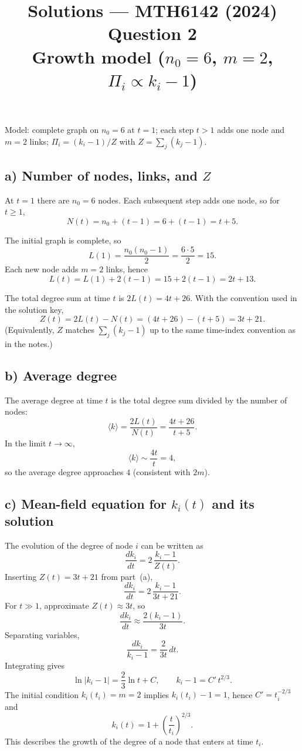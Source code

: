 \documentclass[11pt,a4paper]{article}
\title{Solutions --- MTH6142 (2024) Question 2\\Growth model ($n_0=6$, $m=2$, $\Pi_i \propto k_i-1$)}
\author{}
\date{}
\begin{document}
\maketitle

\noindent
Model: complete graph on $n_0=6$ at $t=1$; each step $t>1$ adds one node and $m=2$ links; $\Pi_i=(k_i-1)/Z$ with $Z=\sum_j(k_j-1)$.

\subsection*{a) Number of nodes, links, and $Z$}

At $t=1$ there are $n_0=6$ nodes. Each subsequent step adds one node, so for $t\ge 1$,
\[
  N(t) = n_0 + (t-1) = 6 + (t-1) = t + 5.
\]

The initial graph is complete, so
\[
  L(1) = \frac{n_0(n_0-1)}{2} = \frac{6\cdot 5}{2} = 15.
\]
Each new node adds $m=2$ links, hence
\[
  L(t) = L(1) + 2(t-1) = 15 + 2(t-1) = 2t + 13.
\]

The total degree sum at time $t$ is $2L(t) = 4t+26$. With the convention used in the solution key,
\[
  Z(t) = 2L(t) - N(t) = (4t + 26) - (t + 5) = 3t + 21.
\]
(Equivalently, $Z$ matches $\sum_j(k_j-1)$ up to the same time-index convention as in the notes.)

\subsection*{b) Average degree}

The average degree at time $t$ is the total degree sum divided by the number of nodes:
\[
  \langle k \rangle = \frac{2L(t)}{N(t)} = \frac{4t + 26}{t + 5}.
\]
In the limit $t\to\infty$,
\[
  \langle k \rangle \sim \frac{4t}{t} = 4,
\]
so the average degree approaches $4$ (consistent with $2m$).

\subsection*{c) Mean-field equation for $k_i(t)$ and its solution}

The evolution of the degree of node $i$ can be written as
\[
  \frac{dk_i}{dt} = 2\,\frac{k_i - 1}{Z(t)}.
\]
Inserting $Z(t) = 3t + 21$ from part~(a),
\[
  \frac{dk_i}{dt} = 2\,\frac{k_i - 1}{3t + 21}.
\]
For $t\gg 1$, approximate $Z(t) \approx 3t$, so
\[
  \frac{dk_i}{dt} \approx \frac{2(k_i - 1)}{3t}.
\]
Separating variables,
\[
  \frac{dk_i}{k_i - 1} = \frac{2}{3t}\,dt.
\]
Integrating gives
\[
  \ln|k_i - 1| = \frac{2}{3}\ln t + C,
  \qquad
  k_i - 1 = C'\, t^{2/3}.
\]
The initial condition $k_i(t_i)=m=2$ implies $k_i(t_i)-1=1$, hence $C' = t_i^{-2/3}$ and
\[
  k_i(t) = 1 + \left(\frac{t}{t_i}\right)^{2/3}.
\]
This describes the growth of the degree of a node that enters at time $t_i$.
\end{document}
